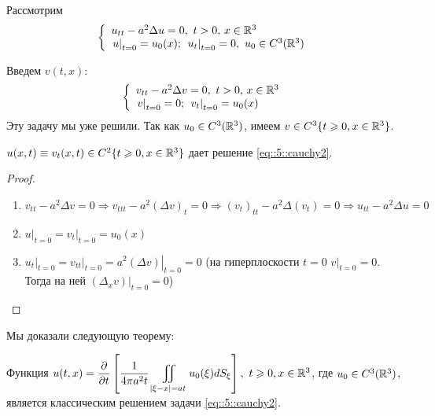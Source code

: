Рассмотрим
\begin{equation}
\left\{
  \begin{array}{ll}
  u_{tt}-a^2\Delta u=0,\ t>0,\, x\in \mathbb{R}^3\\
  \left. u\right|_{t=0}=u_0(x);\ \left. u_t\right|_{t=0}=0,\ u_0\in C^3(\mathbb{R}^3)
  \end{array}
\right.
\label{eq::5::cauchy2}
\end{equation}

Введем $v(t, x)$:
\[
\left\{
  \begin{array}{ll}
  v_{tt}-a^2\Delta v=0,\ t>0,\, x\in \mathbb{R}^3\\
  \left. v\right|_{t=0}=0;\ \left. v_t\right|_{t=0}=u_0(x)
  \end{array}
\right.
\]
Эту задачу мы уже решили. Так как $u_0\in C^3(\mathbb{R}^3)$, имеем $v\in C^3\{t\geqslant 0, x\in\mathbb{R}^3\}$.
\begin{statement}
$u(x, t)\equiv v_t(x, t)\in C^2\{t\geqslant 0, x\in\mathbb{R}^3 \}$ дает решение \eqref{eq::5::cauchy2}.
\end{statement}
\begin{proof}$\ $
\begin{enumerate}
\item $v_{tt}-a^2\Delta v=0 \Rightarrow v_{ttt}-a^2(\Delta v)_t=0\Rightarrow (v_t)_{tt}-a^2\Delta (v_t)=0\Rightarrow u_{tt}-a^2\Delta u=0$
\item $\left. u\right|_{t=0}=\left. v_t\right|_{t=0}=u_0(x)$
\item $\left. u_t\right|_{t=0}=\left. v_{tt}\right|_{t=0}=\left. a^2(\Delta v)\right|_{t=0}=0$ (на гиперплоскости $t=0$ $\left. v\right|_{t=0}=0$. Тогда на ней $\left. (\Delta_x v)\right|_{t=0}=0$)
\end{enumerate}
\end{proof}
Мы доказали следующую теорему:
\begin{theorem}
Функция $u(t,x)=\dfrac{\partial}{\partial t}\left[\dfrac{1}{4\pi a^2t}\displaystyle\iint\limits_{|\xi -x|=at}u_0(\xi )dS_{\xi } \right],\ t\geqslant 0,x\in\mathbb{R}^3$, где $u_0\in C^3(\mathbb{R}^3)$, является классическим решением задачи \eqref{eq::5::cauchy2}. 
\end{theorem}




